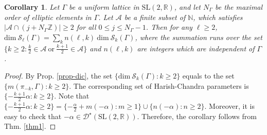 \documentclass[11 pt]{amsart}
\newcommand{\R}{{\mathbb R}}
\newcommand{\Z}{{\mathbb Z}}
\newcommand{\N}{{\mathbb N}}
\newtheorem{corollary}{Corollary}[section]
\theoremstyle{definition}
\numberwithin{equation}{section}
\begin{document}
\begin{corollary}\label{cor-dim}
\textit{Let $\Gamma$ be a uniform lattice in $\mathrm{SL}(2, \R)$, and let $N_{\Gamma}$ be the maximal order of elliptic elements in $\Gamma$. Let $\mathcal{A}$ be a finite subset of $\N$, which satisfies $| \mathcal{A} \cap (j + N_{\Gamma} \Z) | \geq 2$ for all $0 \leq j \leq N_{\Gamma}-1$. Then for any $\ell \geq 2$, $\text{dim}\ \mathcal{S}_{\ell}(\Gamma)=\sum\limits_{k} n(\ell, k)\ \text{dim}\ \mathcal{S}_k(\Gamma)$, where the summation runs over the set $\{k \geq 2  :  \tfrac{k}{2} \in \mathcal{A}\ \text{or}\ \tfrac{k+1}{2} \in \mathcal{A}\}$ and $n(\ell, k)$ are integers which are independent of $\Gamma$.}
\end{corollary}
\begin{proof}
    By Prop. \ref{prop-dic}, the set $\{ \text{dim}\ \mathcal{S}_k(\Gamma) : k \geq 2\}$ equals to the set $\{ m(\pi_{-k}, \Gamma) : k \geq 2 \}$. The corresponding set of Harish-Chandra parameters is $\{ - \tfrac{k+1}{2}\alpha : k \geq 2\}$. Note that $\{ - \tfrac{k+1}{2}\alpha : k \geq 2\}= \{ -\frac{\alpha}{2} + m (-\alpha) : m \geq 1\} \cup \{ n (-\alpha): n \geq 2\}$. Moreover, it is easy to check that $-\alpha \in \mathcal{D^\star}(\mathrm{SL}(2, \R))$. Therefore, the corollary follows from Thm. \ref{thm1}.  
\end{proof}
\end{document}
